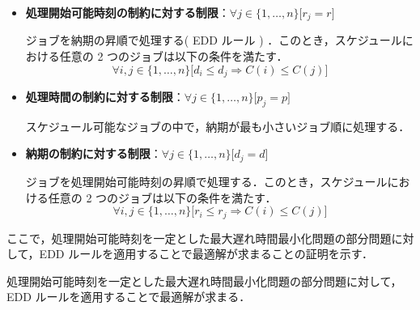 \documentclass[12pt]{optlab-bachelor}
\begin{document}
\begin{itemize}
  \item \textbf{処理開始可能時刻の制約に対する制限}：$\forall j \in \{1,\ldots,n\}\big[ r_j = r \big]$

  ジョブを納期の昇順で処理する( EDD ルール ) ．このとき，スケジュールにおける任意の 2 つのジョブは以下の条件を満たす．
  \begin{displaymath}
    \forall i, j \in \{1,\ldots,n\}\big[d_i \le d_j \Rightarrow C(i) \le C(j)\big]
  \end{displaymath}
  \item \textbf{処理時間の制約に対する制限}：$\forall j \in \{1,\ldots,n\}\big[ p_j = p \big]$

  スケジュール可能なジョブの中で，納期が最も小さいジョブ順に処理する．
  \item \textbf{納期の制約に対する制限}：$\forall j \in \{1,\ldots,n\}\big[ d_j = d \big]$

  ジョブを処理開始可能時刻の昇順で処理する．このとき，スケジュールにおける任意の 2 つのジョブは以下の条件を満たす．
  \begin{displaymath}
    \forall i, j \in \{1,\ldots,n\}\big[r_i \le r_j \Rightarrow C(i) \le C(j)\big]
  \end{displaymath}
\end{itemize}

ここで，処理開始可能時刻を一定とした最大遅れ時間最小化問題の部分問題に対して，EDD ルールを適用することで最適解が求まることの証明を示す．

\begin{lemma}\label{l_5}
  処理開始可能時刻を一定とした最大遅れ時間最小化問題の部分問題に対して，EDD ルールを適用することで最適解が求まる．
\end{lemma}
\end{document}
